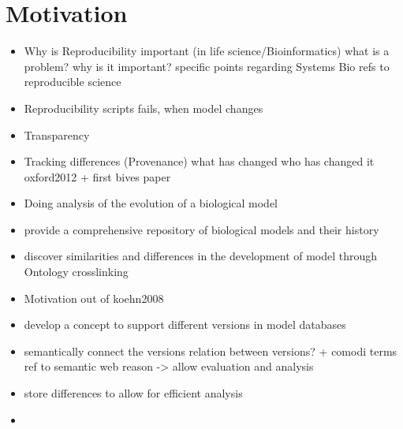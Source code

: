 \section{Motivation}

\begin{itemize}
\item Why is Reproducibility important (in life science/Bioinformatics)
	\subitem what is a problem?
	\subitem why is it important?
	\subitem specific points regarding Systems Bio
	\subitem refs to reproducible science
\item Reproducibility
	\subitem \sedml scripts fails, when model changes

\item Transparency
\item Tracking differences (Provenance)
	\subitem what has changed
	\subitem who has changed it
	\subitem oxford2012 + first bives paper
	
\item Doing analysis of the evolution of a biological model
\item provide a comprehensive repository of biological models and their history
\item discover similarities and differences in the development of model through Ontology crosslinking
\item Motivation out of koehn2008 \cite{Kohn2008}
\end{itemize}

\begin{itemize}
\item develop a concept to support different versions in model databases
	\subitem {}
	\subitem {}
\item semantically connect the versions
	\subitem relation between versions? + comodi terms
	\subitem ref to semantic web
	\subitem reason -> allow evaluation and analysis
\item store differences to allow for efficient analysis
\item {}
\end{itemize}
